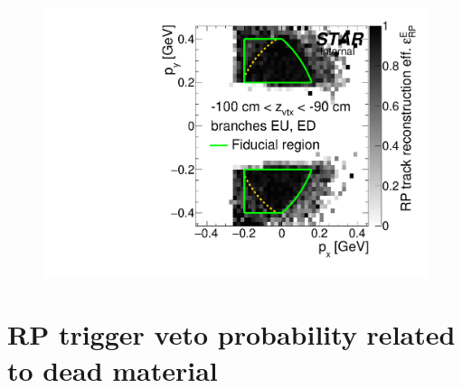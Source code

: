 \begin{figure}[hb]
{  \includegraphics[width=\linewidth,page=38]{graphics/corrections/mcFullEffPxPy.pdf}
}%
\end{figure}





\section{RP trigger veto probability related to dead material}

